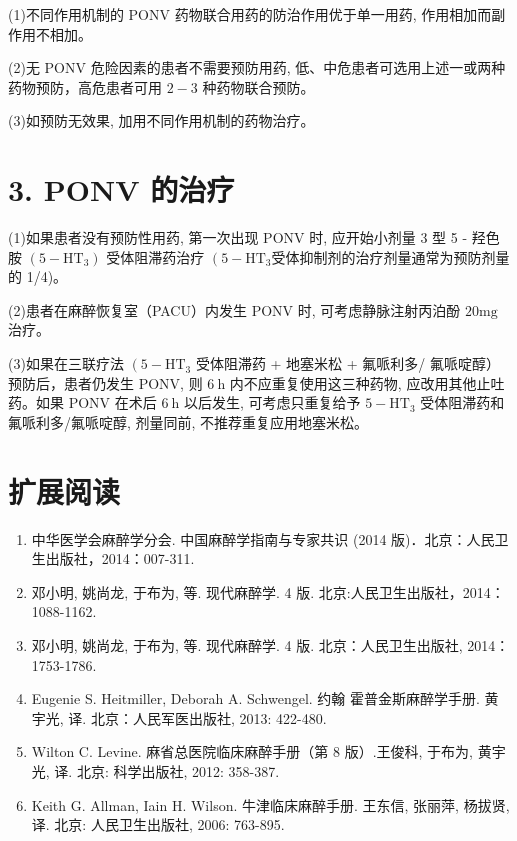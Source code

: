 \documentclass[10pt]{article}
\begin{document}
(1)不同作用机制的 PONV 药物联合用药的防治作用优于单一用药, 作用相加而副作用不相加。

(2)无 PONV 危险因素的患者不需要预防用药, 低、中危患者可选用上述一或两种药物预防，高危患者可用 $2-3$ 种药物联合预防。

(3)如预防无效果, 加用不同作用机制的药物治疗。

\section*{3. PONV 的治疗}
(1)如果患者没有预防性用药, 第一次出现 PONV 时, 应开始小剂量 3 型 5 - 羟色胺 $\left(5-\mathrm{HT}_{3}\right)$ 受体阻滞药治疗 $\left(5-\mathrm{HT}_{3}\right.$受体抑制剂的治疗剂量通常为预防剂量的 1/4)。

(2)患者在麻醉恢复室（PACU）内发生 PONV 时, 可考虑静脉注射丙泊酚 $20 \mathrm{mg}$ 治疗。

(3)如果在三联疗法 $\left(5-\mathrm{HT}_{3}\right.$ 受体阻滞药 + 地塞米松 + 氟哌利多/ 氟哌啶醇）预防后，患者仍发生 PONV, 则 $6 \mathrm{~h}$ 内不应重复使用这三种药物, 应改用其他止吐药。如果 PONV 在术后 $6 \mathrm{~h}$ 以后发生, 可考虑只重复给予 $5-\mathrm{HT}_{3}$ 受体阻滞药和\\
氟哌利多/氟哌啶醇, 剂量同前, 不推荐重复应用地塞米松。

\section*{扩展阅读}
\begin{enumerate}
  \item 中华医学会麻醉学分会. 中国麻醉学指南与专家共识 (2014 版)．北京：人民卫生出版社，2014：007-311.

  \item 邓小明, 姚尚龙, 于布为, 等. 现代麻醉学. 4 版. 北京:人民卫生出版社，2014：1088-1162.

  \item 邓小明, 姚尚龙, 于布为, 等. 现代麻醉学. 4 版. 北京：人民卫生出版社, 2014：1753-1786.

  \item Eugenie S. Heitmiller, Deborah A. Schwengel. 约翰 霍普金斯麻醉学手册. 黄宇光, 译. 北京：人民军医出版社, 2013: 422-480.

  \item Wilton C. Levine. 麻省总医院临床麻醉手册（第 8 版）.王俊科, 于布为, 黄宇光, 译. 北京: 科学出版社, 2012: 358-387.

  \item Keith G. Allman, Iain H. Wilson. 牛津临床麻醉手册. 王东信, 张丽萍, 杨拔贤, 译. 北京: 人民卫生出版社, 2006: 763-895.

\end{enumerate}
\end{document}
